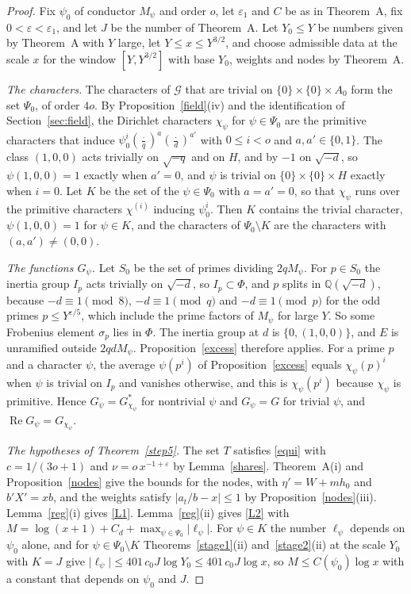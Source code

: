 \begin{proof}
Fix $\psi_0$ of conductor $M_\psi$ and order $o$, let $\varepsilon_1$ and $C$ be as in Theorem~A, fix $0<\varepsilon<\varepsilon_1$, and let $J$ be the number of Theorem~A. Let $Y_0\le Y$ be numbers given by Theorem~A with $Y$ large, let $Y\le x\le Y^{3/2}$, and choose admissible data at the scale $x$ for the window $[Y,Y^{3/2}]$ with base $Y_0$, weights and nodes by Theorem~A.

\emph{The characters.} The characters of $\mathcal G$ that are trivial on $\{0\}\times\{0\}\times A_0$ form the set $\Psi_0$, of order $4o$. By Proposition~\ref{field}(iv) and the identification of Section~\ref{sec:field}, the Dirichlet characters $\chi_\psi$ for $\psi\in\Psi_0$ are the primitive characters that induce $\psi_0^i(\frac{\cdot}{q})^a(\frac{\cdot}{d})^{a'}$ with $0\le i<o$ and $a,a'\in\{0,1\}$. The class $(1,0,0)$ acts trivially on $\sqrt{-q}$ and on $H$, and by $-1$ on $\sqrt{-d}$, so $\psi(1,0,0)=1$ exactly when $a'=0$, and $\psi$ is trivial on $\{0\}\times\{0\}\times H$ exactly when $i=0$. Let $K$ be the set of the $\psi\in\Psi_0$ with $a=a'=0$, so that $\chi_\psi$ runs over the primitive characters $\chi^{(i)}$ inducing $\psi_0^i$. Then $K$ contains the trivial character, $\psi(1,0,0)=1$ for $\psi\in K$, and the characters of $\Psi_0\setminus K$ are the characters with $(a,a')\ne(0,0)$.

\emph{The functions $G_\psi$.} Let $S_0$ be the set of primes dividing $2qM_\psi$. For $p\in S_0$ the inertia group $I_p$ acts trivially on $\sqrt{-d}$, so $I_p\subset\Phi$, and $p$ splits in $\mathbb Q(\sqrt{-d})$, because $-d\equiv1\pmod8$, $-d\equiv1\pmod q$ and $-d\equiv1\pmod p$ for the odd primes $p\le Y^{\varepsilon/5}$, which include the prime factors of $M_\psi$ for large $Y$. So some Frobenius element $\sigma_p$ lies in $\Phi$. The inertia group at $d$ is $\{0,(1,0,0)\}$, and $E$ is unramified outside $2qdM_\psi$. Proposition~\ref{excess} therefore applies. For a prime $p$ and a character $\psi$, the average $\psi(p^i)$ of Proposition~\ref{excess} equals $\chi_\psi(p)^i$ when $\psi$ is trivial on $I_p$ and vanishes otherwise, and this is $\chi_\psi(p^i)$ because $\chi_\psi$ is primitive. Hence $G_\psi=G^\ast_{\chi_\psi}$ for nontrivial $\psi$ and $G_\psi=G$ for trivial $\psi$, and $\operatorname{Re}G_\psi=G_{\chi_\psi}$.

\emph{The hypotheses of Theorem~\ref{step5}.} The set $T$ satisfies \eqref{equi} with $c=1/(3o+1)$ and $\nu=o\,x^{-1+\varepsilon}$ by Lemma~\ref{shares}. Theorem~A(i) and Proposition~\ref{nodes} give the bounds for the nodes, with $\eta'=W+mh_0$ and $b'X'=xb$, and the weights satisfy $\lvert a_t/b-x\rvert\le1$ by Proposition~\ref{nodes}(iii). Lemma~\ref{reg}(i) gives \eqref{L1}. Lemma~\ref{reg}(ii) gives \eqref{L2} with $M=\log(x+1)+C_d+\max_{\psi\in\Psi_0}\lvert\ell_\psi\rvert$. For $\psi\in K$ the number $\ell_\psi$ depends on $\psi_0$ alone, and for $\psi\in\Psi_0\setminus K$ Theorems~\ref{stage1}(ii) and~\ref{stage2}(ii) at the scale $Y_0$ with $K=J$ give $\lvert\ell_\psi\rvert\le401\,c_0J\log Y_0\le401\,c_0J\log x$, so $M\le C(\psi_0)\log x$ with a constant that depends on $\psi_0$ and $J$.


\end{proof}
